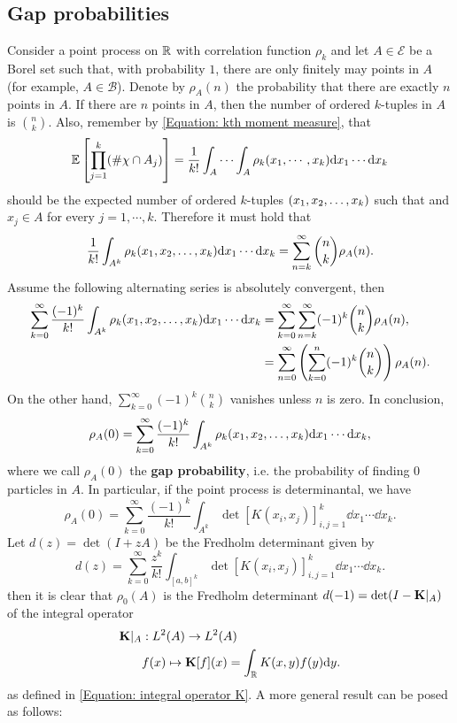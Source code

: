 \subsection{Gap probabilities}

Consider a point process on $\mathbb{R}$ with correlation function $\rho_k$ and let $A \in \mathcal{E}$ be a Borel set such that, with probability $1$, there are only finitely may points in $A$ (for example, $A \in \mathcal{B}$). Denote by $\rho_A(n)$ the probability that there are exactly $n$ points in $A$. If there are $n$ points in $A$, then the number of ordered $k$-tuples in $A$ is $\binom{n}{k}$. Also, remember by \eqref{Equation: kth moment measure}, that 
\begin{equation}
\mathbb{E} \left[ \prod_{j=1}^{k} (\# \chi \cap A_j) \right]= \frac{1}{k!} \int_{A} \cdots \int_{A} \rho_k(x_1, \cdots, x_k) \mathrm{d} x_1 \cdots \mathrm{d} x_k
\end{equation}
should be the expected number of ordered $k$-tuples $(x_1, x_2, \dots, x_k)$ such that  and $x_j \in A$ for every $j = 1, \cdots, k.$ Therefore it must hold that
\begin{equation}
	\frac{1}{k!} \int_{A^k} \rho_k(x_1, x_2, \dots, x_k) \mathrm{d} x_1 \cdots \mathrm{d} x_k = \sum_{n=k}^\infty \binom{n}{k} \rho_A(n).
\end{equation}
Assume the following alternating series is absolutely convergent, then
\begin{align}
	\sum_{k=0}^{\infty} \frac{(-1)^k}{k! } \int_{A^k} \rho_k(x_1, x_2, \dots, x_k) \mathrm{d} x_1 \cdots \mathrm{d} x_k & = \sum_{k=0}^{\infty} \sum_{n=k}^\infty (-1)^k \binom{n}{k} \rho_A(n), \\
	& = \sum_{n=0}^\infty \left( \sum_{k=0}^{n} (-1)^k \binom{n}{k} \right) \rho_A(n).
\end{align}
On the other hand, $\sum_{k=0}^\infty (-1)^k \binom{n}{k}$ vanishes unless $n$ is zero. In conclusion,
\begin{equation}
	\rho_A(0) = \sum_{k=0}^{\infty} \frac{(-1)^k}{k! } \int_{A^k} \rho_k(x_1, x_2, \dots, x_k) \mathrm{d} x_1 \cdots \mathrm{d} x_k,
\end{equation}
where we call $\rho_A(0)$ the \textbf{gap probability}, i.e. the probability of finding $0$ particles in $A$. In particular, if the point process is determinantal, we have
\begin{equation}
	\rho_A(0) = \sum_{k=0}^{\infty}  \frac{(-1)^k}{k! } \int_{A^k} \det[K(x_i, x_j)]_{i,j = 1}^k \dd x_1 \cdots \dd x_k.
\end{equation}
Let $d(z) = \det(I + zA)$ be the Fredholm determinant given by
\begin{equation}
	d(z) = \sum_{k=0}^{\infty}  \frac{z^k}{k! } \int_{[a,b]^k} \det[K(x_i, x_j)]_{i,j = 1}^k \dd x_1 \cdots \dd x_k.
\end{equation}
then it is clear that $\rho_0(A)$ is the Fredholm determinant $d(-1) = \det(I - \bold{K}|_A)$ of the integral operator
\begin{align}
	\bold{K}|_A &: L^2(A) \rightarrow L^2(A) \\
	& f(x) \mapsto \bold{K}[f](x) = \int_{\mathbb{R}} K(x,y) f(y) \mathrm{d} y.
\end{align}
as defined in \eqref{Equation: integral operator K}. A more general result can be posed as follows:

